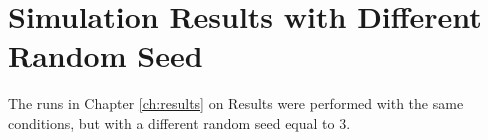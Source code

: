 \documentclass[11pt]{ucthesis}
\begin{document}



\begin{frontmatter}

\maketitle
\copyrightpage

\tableofcontents
\listoffigures

\end{frontmatter}















%



\appendix
\chapter{Simulation Results with Different Random Seed} 
\label{app:add_results}
The runs in Chapter \ref{ch:results} on Results were performed with the same conditions, but with a different random seed equal to $3$.


\nocite{*}


\end{document}

